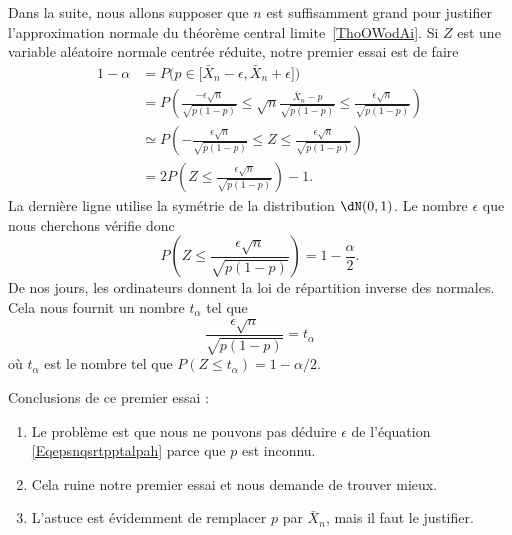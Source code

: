 Dans la suite, nous allons supposer que \( n\) est suffisamment grand pour justifier l'approximation normale du théorème central limite~\ref{ThoOWodAi}. Si \( Z\) est une variable aléatoire normale centrée réduite, notre premier essai est de faire
\begin{subequations}
	\begin{align}
		1-\alpha & =P\big( p\in\mathopen[ \bar X_n-\epsilon , \bar X_n+\epsilon \mathclose] \big) \label{subEqumaleftLthe}                                                      \\
		         & =P\left( \frac{ -\epsilon\sqrt{n} }{ \sqrt{p(1-p)} }\leq \sqrt{n}\frac{ \bar X_n-p }{ \sqrt{p(1-p)} }\leq \frac{ \epsilon\sqrt{n} }{ \sqrt{p(1-p)} } \right) \\
		         & \simeq P\left( -\frac{ \epsilon\sqrt{n} }{ \sqrt{p(1-p)} }\leq Z\leq \frac{ \epsilon\sqrt{n} }{ \sqrt{p(1-p)} } \right)                                      \\
		         & =2P\left( Z\leq \frac{ \epsilon\sqrt{n} }{ \sqrt{p(1-p)} } \right)-1.
	\end{align}
\end{subequations}
La dernière ligne utilise la symétrie de la distribution \( \dN(0,1)\). Le nombre \( \epsilon\) que nous cherchons vérifie donc
\begin{equation}
	P\left( Z\leq \frac{ \epsilon\sqrt{n} }{ \sqrt{p(1-p)} } \right)=1-\frac{ \alpha }{2}.
\end{equation}
De nos jours, les ordinateurs donnent la loi de répartition inverse des normales. Cela nous fournit un nombre \( t_{\alpha}\) tel que
\begin{equation}    \label{Eqepsnqsrtpptalpah}
	\frac{ \epsilon\sqrt{n} }{ \sqrt{p(1-p)} }=t_{\alpha}
\end{equation}
où \( t_{\alpha}\) est le nombre tel que \( P(Z\leq t_{\alpha})=1-\alpha/2\).

Conclusions de ce premier essai :
\begin{enumerate}
	\item

	      Le problème est que nous ne pouvons pas déduire \( \epsilon\) de l'équation \eqref{Eqepsnqsrtpptalpah} parce que \( p\) est inconnu.

	\item
	      Cela ruine notre premier essai et nous demande de trouver mieux.

	\item
	      L'astuce est évidemment de remplacer \( p\) par \( \bar X_n\), mais il faut le justifier.

\end{enumerate}

